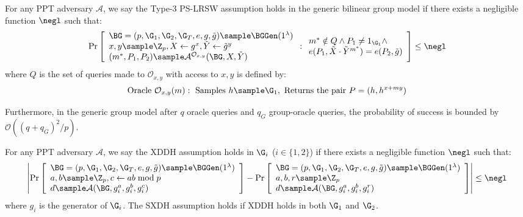 \begin{definition}
For any PPT adversary $\mathcal{A}$, we say the Type-3 PS-LRSW assumption holds in the generic bilinear group model if there exists a negligible function $\negl$ such that:
$$\Pr\left[\begin{array}{l}
    \BG = (p, \G_1, \G_2, \G_T, e, g, \tilde{g}) \sample \BGGen(1^\lambda) \\
    x,y \sample \Z_p, X \gets g^x, \tilde{Y} \gets \tilde{g}^y \\
    (m^*, P_1, P_2) \sample \mathcal{A}^{\mathcal{O}_{x,y}}(\BG, X, \tilde{Y})
\end{array} : \begin{array}{l}
    m^* \notin Q \land P_1 \neq 1_{\G_1} \land \\
    e(P_1, \tilde{X} \cdot \tilde{Y}^{m^*}) = e(P_2, \tilde{g})
\end{array}\right] \leq \negl$$
where $Q$ is the set of queries made to $\mathcal{O}_{x,y}$ with access to $x,y$ is defined by:
\[
\text{Oracle }\mathcal{O}_{x,y}(m): \text{ Samples } h \sample \G_1, \text{ Returns the pair } P = (h, h^{x+my})
\]

\noindent Furthermore, in the generic group model after $q$ oracle queries and $q_G$ group-oracle queries, the probability of success is bounded by $\mathcal{O}((q + q_G)^2/p)$.
\end{definition}



\begin{definition}
For any PPT adversary $\mathcal{A}$, we say the XDDH assumption holds in $\G_i$ ($i \in \{1,2\}$) if there exists a negligible function $\negl$ such that:
$$\left|\Pr\left[\begin{array}{l}
    \BG = (p, \G_1, \G_2, \G_T, e, g, \tilde{g}) \sample \BGGen(1^\lambda) \\
    a, b \sample \Z_p, c \gets ab \bmod p \\
    d \sample \mathcal{A}(\BG, g_i^a, g_i^b, g_i^c)
\end{array}\right] - 
\Pr\left[\begin{array}{l}
    \BG = (p, \G_1, \G_2, \G_T, e, g, \tilde{g}) \sample \BGGen(1^\lambda) \\
    a, b, r \sample \Z_p \\
    d \sample \mathcal{A}(\BG, g_i^a, g_i^b, g_i^r)
\end{array}\right]\right| \leq \negl$$
where $g_i$ is the generator of $\G_i$. The SXDH assumption holds if XDDH holds in both $\G_1$ and $\G_2$.
\end{definition}





